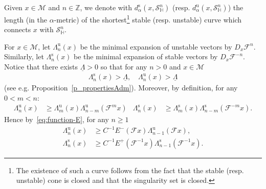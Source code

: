 \documentclass[10pt]{amsart}
\theoremstyle{definition}\newtheorem{defi}[theo]{Definition}\newtheorem{rema}[theo]{Remark}\newtheorem{exam}[theo]{Example}\newtheorem{exem}[theo]{Example}\newtheorem{nota}[theo]{Notation}
\newcommand{\inv}{^{-1}}
\newcommand{\unstable}{\text{u}}
\newcommand{\stable}{\text{s}}
\newcommand{\bZ}{\mathbb{Z}}
\newcommand{\homo}{\mathbb{H}}
\newcommand{\cm}{\mathcal{F}}
\newcommand{\csp}{\mathcal{M}}
\newcommand{\dadmPrivate}{d\adm}
\newcommand{\ds}{\dadmPrivate^{\stable}}
\newcommand{\du}{\dadmPrivate^{\unstable}}
\newcommand{\singPrivate}{\mathcal{S}}
\newcommand{\hsing}[1]{{\singPrivate}_\homo^{#1}}
\newcommand{\adm}{_{\alpha^{+}}}
\newcommand{\admName}{\alpha^{+}}
\renewcommand{\admName}{\alpha}
\renewcommand{\adm}{_{\alpha}}
\begin{document}
Given $x\in\csp$ and $n\in\bZ$, we denote with $\ds(x,\hsing n)$ (resp. $\du(x,\hsing n)$) the length (in the $\admName$-metric) of the shortest\footnote{The existence of such a curve follows from the fact that the stable (resp. unstable) cone is closed and that the singularity set is closed.} stable (resp. unstable) curve which connects $x$ with $\hsing n$.

For $x\in\csp$, let $\Lambda^{\unstable}_{n}(x)$ be the minimal expansion of unstable vectors by $D_{x}\cm^{n}$. Similarly, let $\Lambda^{\stable}_{n}(x)$ be the minimal expansion of stable vectors by $D_{x}\cm^{-n}$. Notice that there exists $\underline\Lambda > 0$ so that for any $n > 0$ and $x\in\csp$
\begin{align}\label{eq:lambda-lowerbar}
\Lambda_{n}^{\stable}(x) > \underline\Lambda, \quad
\Lambda_{n}^{\unstable}(x) > \underline\Lambda
\end{align}
(see e.g. Proposition~\ref{p_propertiesAdm}). Moreover, by definition, for any $0 < m < n$:
\begin{align*}
\Lambda^{\unstable}_{n}(x)&\ge\Lambda^{\unstable}_{m}(x)\Lambda^{\unstable}_{n-m}(\cm^{m}x)&
\Lambda^{\stable}_{n}(x)&\ge\Lambda^{\stable}_{m}(x)\Lambda^{\stable}_{n-m}(\cm^{-m}x).
\end{align*}
Hence by~\eqref{eq:function-E}, for any $n\ge 1$
\begin{subequations}
\begin{align}\label{eq:lambda-E}
\Lambda^{\unstable}_{n}(x)&\ge C^{-1} E^{-}(\cm x)\Lambda^{\unstable}_{n-1}(\cm x),\\\label{eq:lambda-EE}
\Lambda^{\stable}_{n}(x)&\ge C^{-1} E^{+}(\cm\inv x)\Lambda^{\stable}_{n-1}(\cm\inv x).
\end{align}
\end{subequations}
\end{document}
